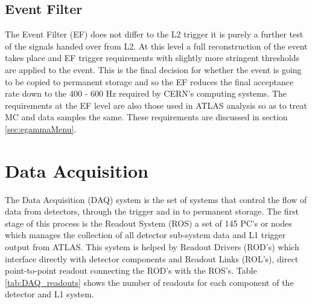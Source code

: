 

	\subsection*{Event Filter}
		The Event Filter (EF) does not differ to the L2 trigger it is purely a further test of the signals handed over from L2. At this level a full reconstruction of the event takes place and EF trigger requirements with slightly more stringent thresholds are applied to the event. This is the final decision for whether the event is going to be copied to permanent storage and so the EF reduces the final acceptance rate down to the 400 - 600 Hz required by CERN's computing systems. The requirements at the EF level are also those used in ATLAS analysis so as to treat MC and data samples the same. These requirements are discussed in section \ref{sec:egammaMenu}.
	



\section{Data Acquisition}
\label{sec:trig_DAQ}

	The Data Acquisition (DAQ) system is the set of systems that control the flow of data from detectors, through the trigger and in to permanent storage. The first stage of this process is the Readout System (ROS) a set of 145 PC's or nodes which manages the collection of all detector sub-system data and L1 trigger output from ATLAS. This system is helped by Readout Drivers (ROD's) which interface directly with detector components and Readout Links (ROL's), direct point-to-point readout connecting the ROD's with the ROS's. Table \ref{tab:DAQ_readouts} shows the number of readouts for each component of the detector and L1 system.


